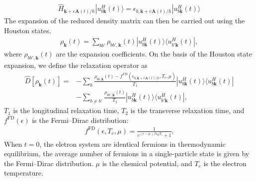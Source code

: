 \begin{align}
\hat{H}_{\mathbf{k}+e\mathbf{A}(t)/\hbar} |u^H_{b\mathbf k}(t)\rangle = \epsilon_{b,\mathbf k + e\mathbf A(t)/\hbar}|u^H_{b\mathbf k}(t)\rangle   
\label{eqn:Houston}
\end{align}
The expansion of the reduced density matrix can then be carried out using the Houston states.
\begin{align}
  \rho_{\mathbf k}(t) = \sum_{bb'}\rho_{bb',\mathbf k}(t)|u^H_{b\mathbf k}(t)\rangle \langle u^H_{b'\mathbf k}(t)|,
\end{align}
where $\rho_{bb',\mathbf k}(t)$ are the expansion coefficients. On the basis of the Houston state expansion, we define the relaxation operator \cite{sato2019microscopic,PhysRevB.99.214302,sato2019light} as
\begin{align}
    \hat D\left [\rho_{\mathbf k}(t) \right ]=&-\sum_{b}\frac{\rho_{bb,\mathbf k}(t)-f^{FD}\left
(\epsilon_{b,\mathbf k+e\mathbf A(t)/\hbar},T_e,\mu \right)}{T_1}|u^H_{b\mathbf k}(t)\rangle \langle
u^H_{b\mathbf k}(t)|\\ 
                                            &-\sum_{b\neq b'} \frac{\rho_{bb',\mathbf k}(t)}{T_2}|u^H_{b\mathbf k}(t)\rangle \langle u^H_{b'\mathbf k}(t)|,
\label{eqn:relaxation}
\end{align}
$T_1$ is the longitudinal relaxation time, $T_2$ is the transverse relaxation time, and
$f^{\mathrm{FD}}(\epsilon)$ is the Fermi--Dirac distribution:
\begin{align}
f^{\mathrm{FD}}(\epsilon, T_e, \mu)=\frac{1}{e^{(\epsilon-\mu)/k_BT_e}+1}.
\label{eq:fd-dist}
\end{align}
When $t=0$, the eletron system are identical fermions in thermodynamic equilibrium, the average number of fermions in a single-particle state is given by the Fermi–Dirac distribution. $\mu$ is the chemical potential, and $T_e$ is the electron temperature.

